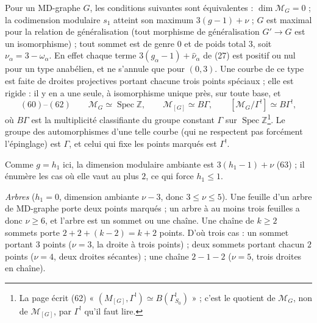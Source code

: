\documentclass[11pt,a4paper]{article}
\begin{document}
Pour un MD-graphe $G$, les conditions suivantes sont équivalentes : $\dim
\mathcal{M}_G = 0$ ; la codimension modulaire $s_1$ atteint son maximum $3(g - 1)
+ \nu$ ; $G$ est maximal pour la relation de généralisation (tout morphisme de
généralisation $G' \to G$ est un isomorphisme) ; tout sommet est de genre $0$ et de
poids total $3$, soit $\nu_\alpha = 3 - \omega_\alpha$. En effet chaque terme
$3(g_\alpha - 1) + \widehat{\nu}_\alpha$ de (27) est positif ou nul pour un type
anabélien, et ne s'annule que pour $(0, 3)$. Une courbe de ce type est faite de
droites projectives portant chacune trois points spéciaux ; elle est rigide : il y en a une seule, à isomorphisme unique près, sur toute base, et
\[
(60)\text{--}(62) \qquad \mathcal{M}_G \simeq \operatorname{Spec} \mathbb{Z},
\qquad \mathcal{M}_{[G]} \simeq B\Gamma, \qquad [\mathcal{M}_G/\Gamma^{!}] \simeq
B\Gamma^{!},
\]
où $B\Gamma$ est la multiplicité classifiante du groupe constant $\Gamma$ sur
$\operatorname{Spec} \mathbb{Z}$\footnote{La page écrit (62) « $(M_{[G]},
\Gamma^{!}) \simeq B(\Gamma^{!}_{S_0})$ » ; c'est le quotient de $\mathcal{M}_G$,
non de $\mathcal{M}_{[G]}$, par $\Gamma^{!}$ qu'il faut lire.}. Le groupe des
automorphismes d'une telle courbe (qui ne respectent pas forcément l'épinglage)
est $\Gamma$, et celui qui fixe les points marqués est $\Gamma^{!}$.

Comme $g = h_1$ ici, la dimension modulaire ambiante est $3(h_1 - 1) + \nu$ (63) ;
il énumère les cas où elle vaut au plus $2$, ce qui force $h_1 \leq 1$.

\emph{Arbres} ($h_1 = 0$, dimension ambiante $\nu - 3$, donc $3 \leq \nu \leq 5$).
Une feuille d'un arbre de MD-graphe porte deux points marqués ; un arbre à au
moins trois feuilles a donc $\nu \geq 6$, et l'arbre est un sommet ou une chaîne.
Une chaîne de $k \geq 2$ sommets porte $2 + 2 + (k - 2) = k + 2$ points. D'où trois
cas : un sommet portant $3$ points ($\nu = 3$, la droite à trois points) ; deux
sommets portant chacun $2$ points ($\nu = 4$, deux droites sécantes) ; une chaîne
$2 - 1 - 2$ ($\nu = 5$, trois droites en chaîne).
\end{document}
